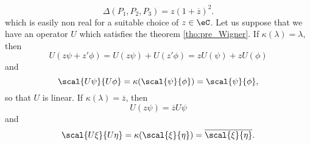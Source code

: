 \[
  \Delta(P_1,P_2,P_3)=z(1+\overline{z})^2.
\]
which is easily non real for a suitable choice of $z\in\eC$. Let us suppose that we have an operator $U$ which satisfies the theorem \ref{tho:pre_Wigner}. If $\kappa(\lambda)=\lambda$, then
\begin{equation}
U(z\psi+z'\phi)=U(z\psi)+U(z'\phi)
               =zU(\psi)+zU(\phi)
\end{equation}
and 
\begin{equation}
\scal{U\psi}{U\phi}=\kappa(\scal{\psi}{\phi})
	=\scal{\psi}{\phi},
\end{equation}
so that $U$ is linear. If $\kappa(\lambda)=\overline{z}$, then 
\begin{equation}
 U(z\psi)=\overline{z}U\psi
\end{equation}
and
\begin{equation}
\scal{U\xi}{U\eta}=\kappa(\scal{\xi}{\eta})
                  =\overline{\scal{\xi}{\eta}}.
\end{equation}


